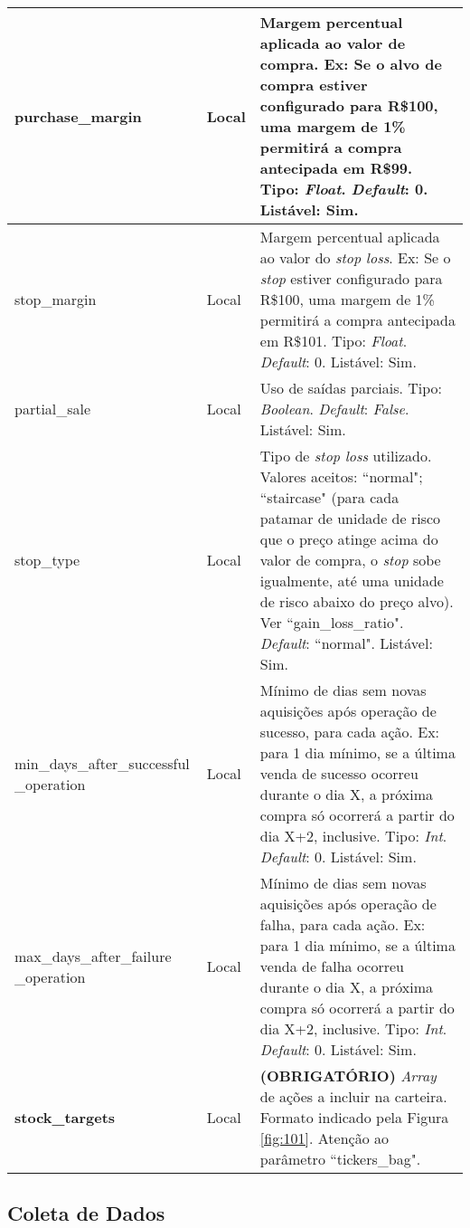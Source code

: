 \begin{center}
{\begin{longtable}[m]{| m{11em} | m{3em}| m{21em} |}
        purchase\_margin & Local & Margem percentual aplicada ao valor de compra. Ex: Se o alvo de compra estiver configurado para R\$100, uma margem de 1\% permitirá a compra antecipada em R\$99. Tipo: \textit{Float}. \textit{Default}: 0. Listável: Sim. \\
        \hline
        stop\_margin & Local & Margem percentual aplicada ao valor do \textit{stop loss}. Ex: Se o \textit{stop} estiver configurado para R\$100, uma margem de 1\% permitirá a compra antecipada em R\$101. Tipo: \textit{Float}. \textit{Default}: 0. Listável: Sim. \\
        \hline
        partial\_sale & Local & Uso de saídas parciais. Tipo: \textit{Boolean}. \textit{Default}: \textit{False}. Listável: Sim. \\
        \hline
        stop\_type & Local & Tipo de \textit{stop loss} utilizado. Valores aceitos: ``normal"; ``staircase" (para cada patamar de unidade de risco que o preço atinge acima do valor de compra, o \textit{stop} sobe igualmente, até uma unidade de risco abaixo do preço alvo). Ver ``gain\_loss\_ratio". \textit{Default}: ``normal". Listável: Sim. \\
        \hline
        min\_days\_after\_successful \_operation & Local & Mínimo de dias sem novas aquisições após operação de sucesso, para cada ação. Ex: para 1 dia mínimo, se a última venda de sucesso ocorreu durante o dia X, a próxima compra só ocorrerá a partir do dia X+2, inclusive. Tipo: \textit{Int}. \textit{Default}: 0. Listável: Sim. \\
        \hline
        max\_days\_after\_failure \_operation & Local & Mínimo de dias sem novas aquisições após operação de falha, para cada ação. Ex: para 1 dia mínimo, se a última venda de falha ocorreu durante o dia X, a próxima compra só ocorrerá a partir do dia X+2, inclusive. Tipo: \textit{Int}. \textit{Default}: 0. Listável: Sim. \\
        \hline

        \textbf{stock\_targets} & Local & \textbf{(OBRIGATÓRIO)} \textit{Array} de ações a incluir na carteira. Formato indicado pela Figura \ref{fig:101}. Atenção ao parâmetro ``tickers\_bag". \\
        \hline

    \end{longtable}}
\end{center}



\subsection{Coleta de Dados}
\label{coleta_de_dados}

